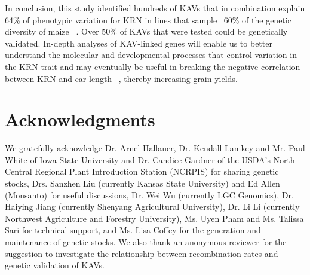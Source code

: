 \documentclass[10pt,letterpaper]{article}
\begin{document}
In conclusion, this study identified hundreds of KAVs that in combination explain 64\% of phenotypic variation for KRN in lines that sample ~60\% of the genetic diversity of maize ~\cite{Liu2003}. Over 50\% of KAVs that were tested could be genetically validated. In-depth analyses of KAV-linked genes will enable us to better understand the molecular and developmental processes that control variation in the KRN trait and may eventually be useful in breaking the negative correlation between KRN and ear length ~\cite{Hallauer2004}, thereby increasing grain yields.





\section*{Acknowledgments}
We gratefully acknowledge Dr. Arnel Hallauer, Dr. Kendall Lamkey and Mr. Paul White of Iowa State University and Dr. Candice Gardner of the USDA’s North Central Regional Plant Introduction Station (NCRPIS) for sharing genetic stocks, Drs. Sanzhen Liu (currently Kansas State University) and Ed Allen (Monsanto) for useful discussions, Dr. Wei Wu (currently LGC Genomics), Dr. Haiying Jiang (currently Shenyang Agricultural University), Dr. Li Li (currently Northwest Agriculture and Forestry University), Ms. Uyen Pham and Ms. Talissa Sari for technical support, and Ms. Lisa Coffey for the generation and maintenance of genetic stocks.  We also thank an anonymous reviewer for the suggestion to investigate the relationship between recombination rates and genetic validation of KAVs.


\nolinenumbers
\end{document}
